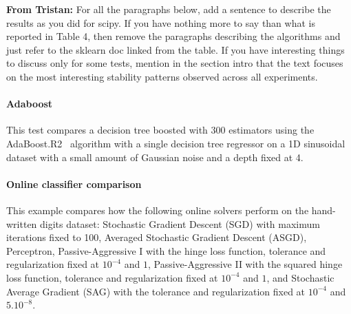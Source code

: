 \documentclass[11pt]{article}
\newcommand{\tristan}[1]{\color{orange}\textbf{From Tristan:} #1\color{black}\xspace}
\begin{document}



\tristan{For all the paragraphs below, add a sentence to describe the results as you did for scipy. If you have nothing more to say than what is reported in Table 4, then remove the paragraphs describing the algorithms and just refer to the sklearn doc linked from the table. If you have interesting things to discuss only for some tests, mention in the section intro that the text focuses on the most interesting stability patterns observed across all experiments.}

\paragraph{Adaboost}
This test compares a decision tree boosted with 300 estimators using the AdaBoost.R2~\cite{drucker1997improving} algorithm with
a single decision tree regressor on a 1D sinusoidal dataset with a small amount of Gaussian noise and a depth fixed at 4. 


\paragraph{Online classifier comparison}

This example compares how the following online solvers perform on the hand-written digits dataset:
Stochastic Gradient Descent (SGD) with maximum iterations fixed to 100, 
Averaged Stochastic Gradient Descent (ASGD),
Perceptron, Passive-Aggressive I with the hinge loss function, tolerance 
and regularization fixed at $10^{-4}$ and $1$,
Passive-Aggressive II with the squared hinge loss function, tolerance 
and regularization fixed at $10^{-4}$ and $1$, and Stochastic Average Gradient (SAG)
with the tolerance and regularization fixed at $10^{-4}$ and $5.10^{-8}$.
\end{document}
